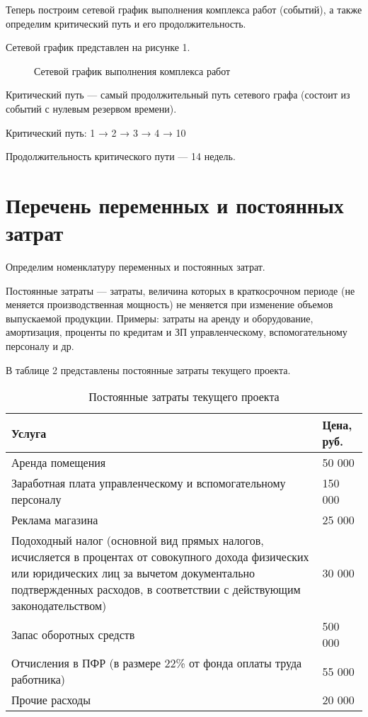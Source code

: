 Теперь построим сетевой график выполнения комплекса работ (событий), а также определим критический путь и его продолжительность.

Сетевой график представлен на рисунке 1. 

\begin{figure}[h!]
	\caption{Сетевой график выполнения комплекса работ}
\center{\texttt{[image: 1]}}
\end{figure}

Критический путь — самый продолжительный путь сетевого графа (состоит из
событий с нулевым резервом времени).

Критический путь: 1 → 2 → 3 → 4 → 10

Продолжительность критического пути — 14 недель.

\newpage
\section*{Перечень переменных и постоянных затрат}

Определим номенклатуру переменных и постоянных затрат.

Постоянные затраты — затраты, величина которых в краткосрочном периоде
(не меняется производственная мощность) не меняется при изменение объемов
выпускаемой продукции. Примеры: затраты на аренду и оборудование,
амортизация, проценты по кредитам и ЗП управленческому, вспомогательному
персоналу и др.

В таблице 2 представлены постоянные затраты текущего проекта.
\begin{table}[h!]
	\caption{Постоянные затраты текущего проекта}
\begin{tabular}{|p{12cm}|p{4cm}|}
	\hline
	Услуга & Цена, руб. \\
	\hline
	Аренда помещения & 50 000 \\
	\hline
	Заработная плата управленческому и
	вспомогательному персоналу
 & 150 000 \\
	\hline
	Реклама магазина & 25 000 \\
	\hline
	Подоходный налог (основной вид прямых
	налогов, исчисляется в процентах от
	совокупного дохода физических или
	юридических лиц за вычетом документально
	подтвержденных расходов, в соответствии с
	действующим законодательством) & 30 000 \\
	\hline
	Запас оборотных средств & 500 000 \\
	\hline
	Отчисления в ПФР (в размере 22\% от фонда
	оплаты труда работника) & 55 000 \\
	\hline
	Прочие расходы & 20 000 \\
	\hline
\end{tabular}
\end{table}

